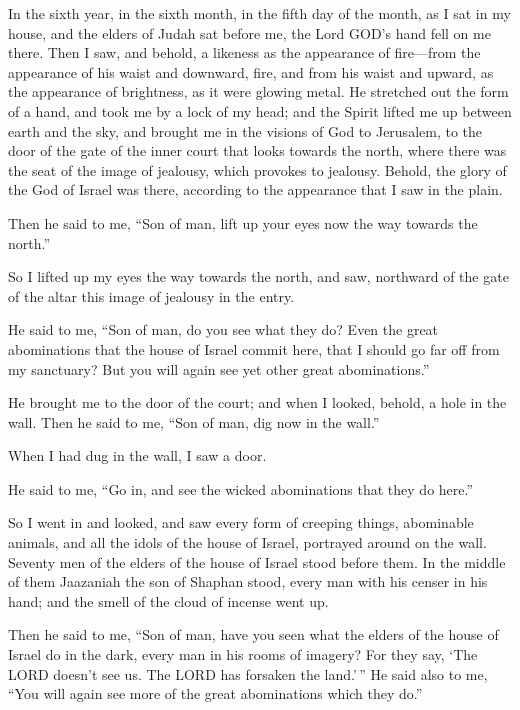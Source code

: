  In the sixth year, in the sixth month, in the fifth day of
the month, as I sat in my house, and the elders of Judah sat before me,
the Lord GOD's hand fell on me there.  Then I saw, and
behold, a likeness as the appearance of fire---from the appearance of
his waist and downward, fire, and from his waist and upward, as the
appearance of brightness, as it were glowing metal.  He
stretched out the form of a hand, and took me by a lock of my head; and
the Spirit lifted me up between earth and the sky, and brought me in the
visions of God to Jerusalem, to the door of the gate of the inner court
that looks towards the north, where there was the seat of the image of
jealousy, which provokes to jealousy.  Behold, the glory of
the God of Israel was there, according to the appearance that I saw in
the plain.

 Then he said to me, ``Son of man, lift up your eyes now the
way towards the north.''

So I lifted up my eyes the way towards the north, and saw, northward of
the gate of the altar this image of jealousy in the entry.

 He said to me, ``Son of man, do you see what they do? Even
the great abominations that the house of Israel commit here, that I
should go far off from my sanctuary? But you will again see yet other
great abominations.''

 He brought me to the door of the court; and when I looked,
behold, a hole in the wall.  Then he said to me, ``Son of
man, dig now in the wall.''

When I had dug in the wall, I saw a door.

 He said to me, ``Go in, and see the wicked abominations
that they do here.''

 So I went in and looked, and saw every form of creeping
things, abominable animals, and all the idols of the house of Israel,
portrayed around on the wall.  Seventy men of the elders of
the house of Israel stood before them. In the middle of them Jaazaniah
the son of Shaphan stood, every man with his censer in his hand; and the
smell of the cloud of incense went up.

 Then he said to me, ``Son of man, have you seen what the
elders of the house of Israel do in the dark, every man in his rooms of
imagery? For they say, `The LORD doesn't see us. The LORD has forsaken
the land.'\,''  He said also to me, ``You will again see
more of the great abominations which they do.''

